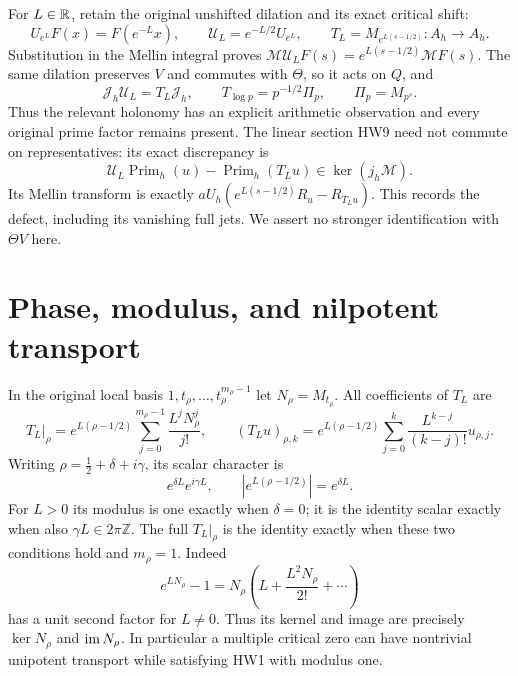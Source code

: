\documentclass[11pt,a4paper]{article}
\theoremstyle{definition}\newtheorem{definition}[theorem]{Definition}
\newcommand{\Z}{\mathbb Z}\newcommand{\Q}{\mathbb Q}
\providecommand{\M}{\mathcal M}
\begin{document}
For \(L\in\mathbb R\), retain the original unshifted dilation and its
exact critical shift:
\[
 U_{e^L}F(x)=F(e^{-L}x),\qquad
 \mathcal U_L=e^{-L/2}U_{e^L},\qquad
 T_L=M_{e^{L(s-1/2)}}:A_h\longrightarrow A_h.
 \tag{HW10}
\]
Substitution in the Mellin integral proves
\(\M\mathcal U_LF(s)=e^{L(s-1/2)}\M F(s)\).
The same dilation preserves \(V\) and commutes with \(\Theta\),
so it acts on \(Q\), and
\[
 \mathcal J_h\mathcal U_L=T_L\mathcal J_h,\qquad
 T_{\log p}=p^{-1/2}\Pi_p,\qquad \Pi_p=M_{p^s}.
 \tag{HW11}\label{hw:intertwine}
\]
Thus the relevant holonomy has an explicit arithmetic observation
and every original prime factor remains present. The linear section
HW9 need not commute on representatives: its exact discrepancy is
\[
 \mathcal U_L\operatorname{Prim}_h(u)
       -\operatorname{Prim}_h(T_Lu)\in\ker(j_h\M).
 \tag{HW12}
\]
Its Mellin transform is exactly
\(aU_h(e^{L(s-1/2)}R_u-R_{T_Lu})\).
This records the defect, including its vanishing full jets.
We assert no stronger identification with \(\Theta V\) here.

\section{Phase, modulus, and nilpotent transport}

In the original local basis \(1,t_\rho,\ldots,t_\rho^{m_\rho-1}\)
let \(N_\rho=M_{t_\rho}\). All coefficients of \(T_L\) are
\[
 T_L|_\rho
 =e^{L(\rho-1/2)}
       \sum_{j=0}^{m_\rho-1}\frac{L^jN_\rho^j}{j!},\qquad
 (T_Lu)_{\rho,k}
 =e^{L(\rho-1/2)}
       \sum_{j=0}^k\frac{L^{k-j}}{(k-j)!}u_{\rho,j}.
 \tag{HW13}\label{hw:fullmonodromy}
\]
Writing \(\rho=\tfrac12+\delta+i\gamma\), its scalar character is
\[
 e^{\delta L}e^{i\gamma L},\qquad
 \left|e^{L(\rho-1/2)}\right|=e^{\delta L}.
 \tag{HW14}
\]
For \(L>0\) its modulus is one exactly when \(\delta=0\);
it is the identity scalar exactly when also
\(\gamma L\in2\pi\Z\). The full \(T_L|_\rho\) is the identity
exactly when these two conditions hold and \(m_\rho=1\).
Indeed
\[
 e^{LN_\rho}-1=N_\rho
  \left(L+\frac{L^2N_\rho}{2!}+\cdots\right)
 \tag{HW15}
\]
has a unit second factor for \(L\ne0\). Thus its kernel and image
are precisely \(\ker N_\rho\) and \(\operatorname{im} N_\rho\).
In particular a multiple critical zero can have nontrivial
unipotent transport while satisfying HW1 with modulus one.
\end{document}
